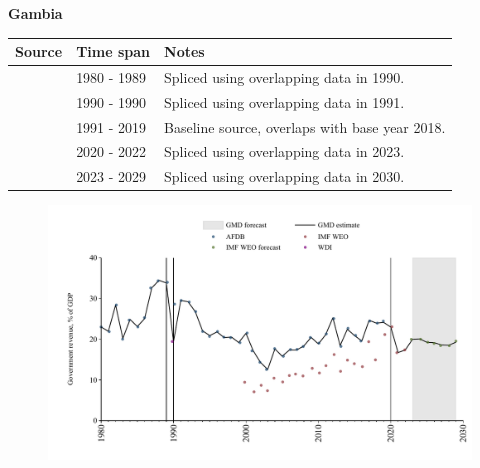 \documentclass[12pt,a4paper,landscape]{article}
\begin{document}
\begin{adjustbox}{max totalsize={\paperwidth}{\paperheight},center}
\begin{minipage}[t][\textheight][t]{\textwidth}
\vspace*{0.5cm}
{}
\begin{center}
{\Large\bfseries Gambia}
\end{center}
\vspace{0.5cm}
\begin{table}[H]
\centering
\small
\begin{tabular}{|l|l|l|}
\hline
\textbf{Source} & \textbf{Time span} & \textbf{Notes} \\
\hline
\rowcolor{white}\cite{AFDB}& 1980 - 1989 &Spliced using overlapping data in 1990.\\
\rowcolor{lightgray}\cite{WDI}& 1990 - 1990 &Spliced using overlapping data in 1991.\\
\rowcolor{white}\cite{AFDB}& 1991 - 2019 &Baseline source, overlaps with base year 2018.\\
\rowcolor{lightgray}\cite{IMF_WEO}& 2020 - 2022 &Spliced using overlapping data in 2023.\\
\rowcolor{white}\cite{IMF_WEO_forecast}& 2023 - 2029 &Spliced using overlapping data in 2030.\\
\hline
\end{tabular}
\end{table}
\begin{figure}[H]
\centering
\includegraphics[width=\textwidth,height=0.6\textheight,keepaspectratio]{graphs/GMB_govrev_GDP.pdf}
\end{figure}
\end{minipage}
\end{adjustbox}
\end{document}
